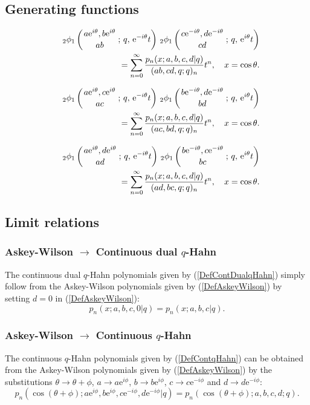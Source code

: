 \documentclass[envcountchap,graybox]{svmono}
\newcounter{rom}
\newcommand{\qhyp}[5]{\mbox{}_{#1}{\phi}_{#2}
\left(\genfrac{}{}{0pt}{}{#3}{#4}\,;\,q,\,#5\right)}
\newcommand{\e}{\textrm{e}}
\newcommand{\qhyp}[5]{\,\mbox{}_{#1}\phi_{#2}\!\left(
  \genfrac{}{}{0pt}{}{#3}{#4};#5\right)}
\begin{document}
\subsection*{Generating functions}
\begin{eqnarray}
\label{GenAskeyWilson1}
& &\qhyp{2}{1}{a\e^{i\theta},b\e^{i\theta}}{ab}{\e^{-i\theta}t}\,
\qhyp{2}{1}{c\e^{-i\theta},d\e^{-i\theta}}{cd}{\e^{i\theta}t}\nonumber\\
& &{}=\sum_{n=0}^{\infty}\frac{p_n(x;a,b,c,d|q)}{(ab,cd,q;q)_n}t^n,
\quad x=\cos\theta.
\end{eqnarray}

\begin{eqnarray}
\label{GenAskeyWilson2}
& &\qhyp{2}{1}{a\e^{i\theta},c\e^{i\theta}}{ac}{\e^{-i\theta}t}\,
\qhyp{2}{1}{b\e^{-i\theta},d\e^{-i\theta}}{bd}{\e^{i\theta}t}\nonumber\\
& &{}=\sum_{n=0}^{\infty}\frac{p_n(x;a,b,c,d|q)}{(ac,bd,q;q)_n}t^n,
\quad x=\cos\theta.
\end{eqnarray}

\begin{eqnarray}
\label{GenAskeyWilson3}
& &\qhyp{2}{1}{a\e^{i\theta},d\e^{i\theta}}{ad}{\e^{-i\theta}t}\,
\qhyp{2}{1}{b\e^{-i\theta},c\e^{-i\theta}}{bc}{\e^{i\theta}t}\nonumber\\
& &{}=\sum_{n=0}^{\infty}\frac{p_n(x;a,b,c,d|q)}{(ad,bc,q;q)_n}t^n,
\quad x=\cos\theta.
\end{eqnarray}

\subsection*{Limit relations}

\subsubsection*{Askey-Wilson $\rightarrow$ Continuous dual $q$-Hahn}
The continuous dual $q$-Hahn polynomials given by (\ref{DefContDualqHahn}) simply follow
from the Askey-Wilson polynomials given by (\ref{DefAskeyWilson}) by setting
$d=0$ in (\ref{DefAskeyWilson}):
\begin{equation}
p_n(x;a,b,c,0|q)=p_n(x;a,b,c|q).
\end{equation}

\subsubsection*{Askey-Wilson $\rightarrow$ Continuous $q$-Hahn}
The continuous $q$-Hahn polynomials given by (\ref{DefContqHahn}) can be obtained
from the Askey-Wilson polynomials given by (\ref{DefAskeyWilson}) by the substitutions
$\theta\rightarrow\theta+\phi$, $a\rightarrow a\e^{i\phi}$, $b\rightarrow b\e^{i\phi}$,
$c\rightarrow c\e^{-i\phi}$ and $d\rightarrow d\e^{-i\phi}$:
\begin{equation}
p_n(\cos(\theta+\phi);a\e^{i\phi},b\e^{i\phi},c\e^{-i\phi},d\e^{-i\phi}|q)=p_n(\cos(\theta+\phi);a,b,c,d;q).
\end{equation}
\end{document}
